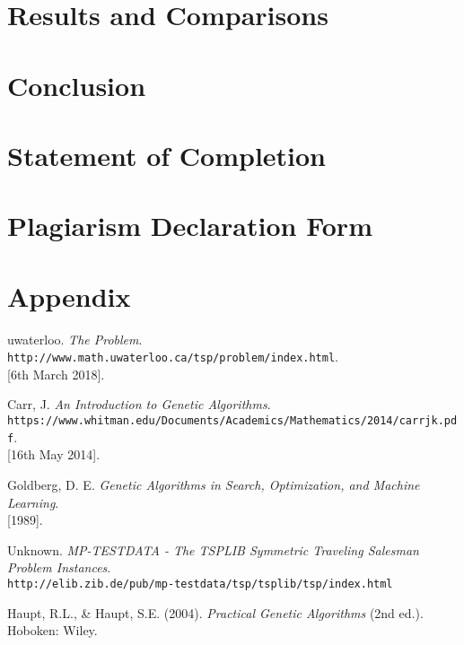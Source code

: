 \documentclass[11pt,a4paper,final]{article}
\begin{document}
	\section{Results and Comparisons}
	\label{Results}
	
	\section{Conclusion}
	\label{Conc}
	
	\section{Statement of Completion}
	\label{SoC}
	
	\section{Plagiarism Declaration Form}
	\label{PlagForm}
	
	\section{Appendix}
	\label{Appendix}
	
	\pagebreak
	\begin{thebibliography}{9}
		uwaterloo.
		\textit{The Problem}.
		\\\texttt{http://www.math.uwaterloo.ca/tsp/problem/index.html}.
		\\{[6th March 2018]}.
		
		Carr, J.
		\textit{An Introduction to Genetic Algorithms}.
		\\\texttt{https://www.whitman.edu/Documents/Academics/Mathematics/2014/carrjk.pdf}.
		\\{[16th May 2014]}.
		
		Goldberg, D. E.
		\textit{Genetic Algorithms in Search, Optimization, and Machine
			Learning}.
		\\{[1989]}.
		
		Unknown.
		\textit{MP-TESTDATA - The TSPLIB Symmetric Traveling Salesman Problem Instances}.
		\\\texttt{http://elib.zib.de/pub/mp-testdata/tsp/tsplib/tsp/index.html}
		
		Haupt, R.L., \& Haupt, S.E. (2004).
		\textit{Practical Genetic Algorithms} (2nd ed.). Hoboken: Wiley.
		
	\end{thebibliography}	
\end{document}
